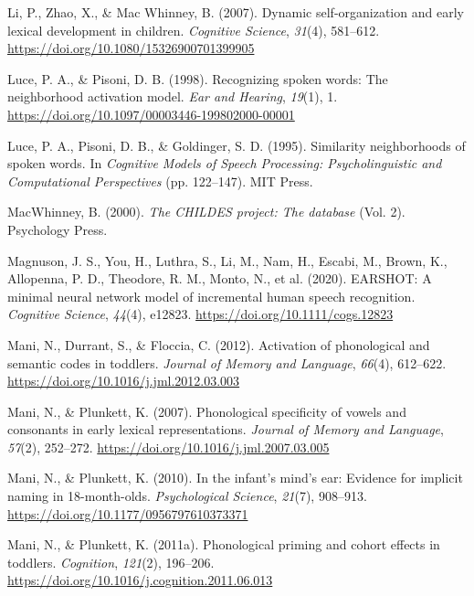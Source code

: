 \documentclass[
  12pt,
  b5paperpaper,
  twoside]{scrreprt}
\newlength{\cslhangindent}
\newlength{\cslentryspacingunit} %
\newenvironment{CSLReferences}[2] %
 {%
  \setlength{\parindent}{0pt}
  \ifodd #1
  \let\oldpar\par
  \def\par{\hangindent=\cslhangindent\oldpar}
  \fi
  \setlength{\parskip}{#2\cslentryspacingunit}
 }%
 {}
\begin{document}
\begin{CSLReferences}{1}{0}
\leavevmode{}%
Li, P., Zhao, X., \& Mac Whinney, B. (2007). Dynamic self-organization
and early lexical development in children. \emph{Cognitive Science},
\emph{31}(4), 581--612. \url{https://doi.org/10.1080/15326900701399905}

\leavevmode{}%
Luce, P. A., \& Pisoni, D. B. (1998). Recognizing spoken words: The
neighborhood activation model. \emph{Ear and Hearing}, \emph{19}(1), 1.
\url{https://doi.org/10.1097/00003446-199802000-00001}

\leavevmode{}%
Luce, P. A., Pisoni, D. B., \& Goldinger, S. D. (1995). Similarity
neighborhoods of spoken words. In \emph{Cognitive {Models} of {Speech
Processing}: {Psycholinguistic} and {Computational Perspectives}} (pp.
122--147). {MIT Press}.

\leavevmode{}%
MacWhinney, B. (2000). \emph{The {CHILDES} project: The database} (Vol.
2). {Psychology Press}.

\leavevmode{}%
Magnuson, J. S., You, H., Luthra, S., Li, M., Nam, H., Escabi, M.,
Brown, K., Allopenna, P. D., Theodore, R. M., Monto, N., et al. (2020).
{EARSHOT}: A minimal neural network model of incremental human speech
recognition. \emph{Cognitive Science}, \emph{44}(4), e12823.
\url{https://doi.org/10.1111/cogs.12823}

\leavevmode{}%
Mani, N., Durrant, S., \& Floccia, C. (2012). Activation of phonological
and semantic codes in toddlers. \emph{Journal of Memory and Language},
\emph{66}(4), 612--622. \url{https://doi.org/10.1016/j.jml.2012.03.003}

\leavevmode{}%
Mani, N., \& Plunkett, K. (2007). Phonological specificity of vowels and
consonants in early lexical representations. \emph{Journal of Memory and
Language}, \emph{57}(2), 252--272.
\url{https://doi.org/10.1016/j.jml.2007.03.005}

\leavevmode{}%
Mani, N., \& Plunkett, K. (2010). In the infant's mind's ear: Evidence
for implicit naming in 18-month-olds. \emph{Psychological Science},
\emph{21}(7), 908--913. \url{https://doi.org/10.1177/0956797610373371}

\leavevmode{}%
Mani, N., \& Plunkett, K. (2011a). Phonological priming and cohort
effects in toddlers. \emph{Cognition}, \emph{121}(2), 196--206.
\url{https://doi.org/10.1016/j.cognition.2011.06.013}


\end{CSLReferences}
\end{document}
